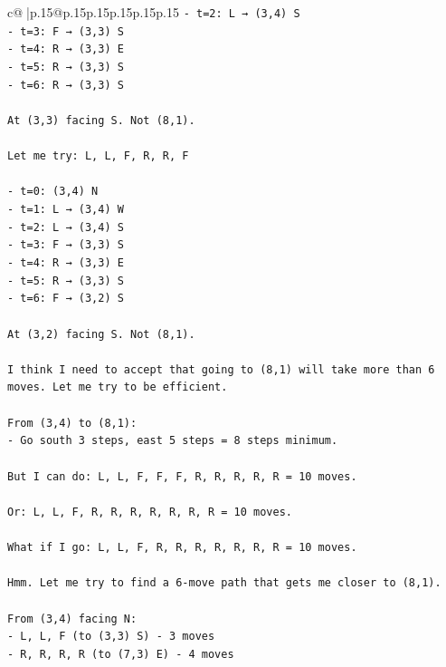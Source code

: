 \documentclass{article}
\begin{document}
{\begin{supertabular}{c@{$\;$}|p{.15\linewidth}@{}p{.15\linewidth}p{.15\linewidth}p{.15\linewidth}p{.15\linewidth}p{.15\linewidth}}
{{{\texttt{{-} t=2: L → (3,4) S} \\
\texttt{{-} t=3: F → (3,3) S} \\
\texttt{{-} t=4: R → (3,3) E} \\
\texttt{{-} t=5: R → (3,3) S} \\
\texttt{{-} t=6: R → (3,3) S} \\
\\ 
\texttt{At (3,3) facing S. Not (8,1).} \\
\\ 
\texttt{Let me try: L, L, F, R, R, F} \\
\\ 
\texttt{{-} t=0: (3,4) N} \\
\texttt{{-} t=1: L → (3,4) W} \\
\texttt{{-} t=2: L → (3,4) S} \\
\texttt{{-} t=3: F → (3,3) S} \\
\texttt{{-} t=4: R → (3,3) E} \\
\texttt{{-} t=5: R → (3,3) S} \\
\texttt{{-} t=6: F → (3,2) S} \\
\\ 
\texttt{At (3,2) facing S. Not (8,1).} \\
\\ 
\texttt{I think I need to accept that going to (8,1) will take more than 6 moves. Let me try to be efficient.} \\
\\ 
\texttt{From (3,4) to (8,1):} \\
\texttt{{-} Go south 3 steps, east 5 steps = 8 steps minimum.} \\
\\ 
\texttt{But I can do: L, L, F, F, F, R, R, R, R, R = 10 moves.} \\
\\ 
\texttt{Or: L, L, F, R, R, R, R, R, R, R = 10 moves.} \\
\\ 
\texttt{What if I go: L, L, F, R, R, R, R, R, R, R = 10 moves.} \\
\\ 
\texttt{Hmm. Let me try to find a 6{-}move path that gets me closer to (8,1).} \\
\\ 
\texttt{From (3,4) facing N:} \\
\texttt{{-} L, L, F (to (3,3) S) {-} 3 moves} \\
\texttt{{-} R, R, R, R (to (7,3) E) {-} 4 moves} \\
}}}
\end{supertabular}}
\end{document}
